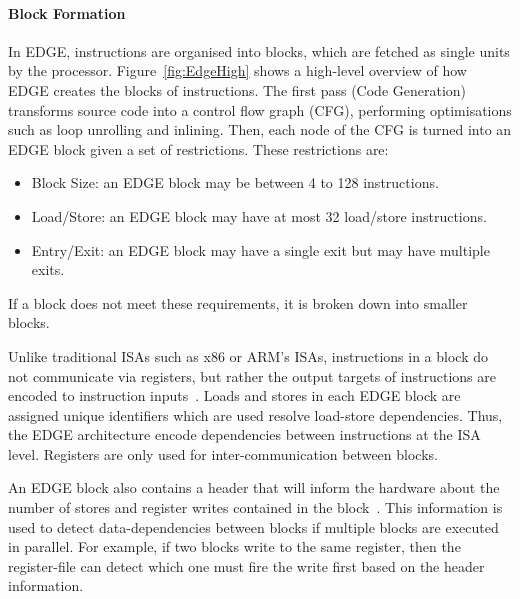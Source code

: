 \paragraph*{Block Formation}
In EDGE, instructions are organised into blocks, which are fetched as single units by the processor.
Figure~\ref{fig:EdgeHigh} shows a high-level overview of how EDGE creates the blocks of instructions.
The first pass (Code Generation) transforms source code into a control flow graph (CFG), performing optimisations such as loop unrolling and inlining.
Then, each node of the CFG is turned into an EDGE block given a set of restrictions.
These restrictions are:
\begin{itemize}
\item Block Size: an EDGE block may be between 4 to 128 instructions.
\vspace{-1em}
\item Load/Store: an EDGE block may have at most 32 load/store instructions.
\vspace{-1em}
\item Entry/Exit: an EDGE block may have a single exit but may have multiple exits.
\end{itemize}
If a block does not meet these requirements, it is broken down into smaller blocks.

Unlike traditional ISAs such as x86 or ARM's ISAs, instructions in a block do not communicate via registers, but rather the output targets of instructions are encoded to instruction inputs~\cite{smith2006edge}.
Loads and stores in each EDGE block are assigned unique identifiers which are used resolve load-store dependencies.
Thus, the EDGE architecture encode dependencies between instructions at the ISA level.
Registers are only used for inter-communication between blocks.

An EDGE block also contains a header that will inform the hardware about the number of stores and register writes contained in the block~\cite{smith2006edge}.
This information is used to detect data-dependencies between blocks if multiple blocks are executed in parallel.
For example, if two blocks write to the same register, then the register-file can detect which one must fire the write first based on the header information. 

